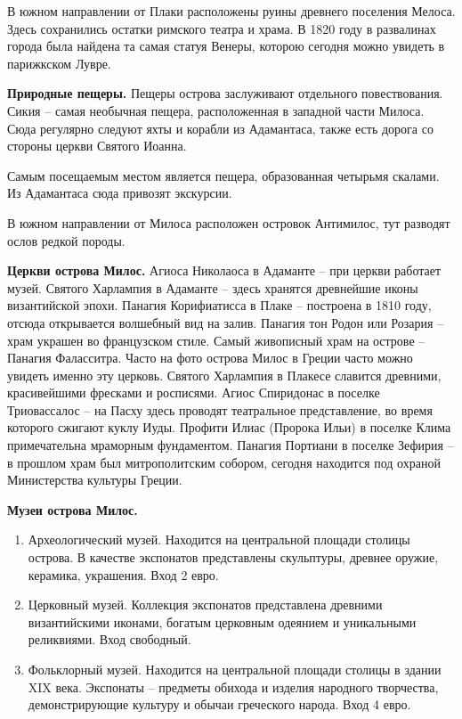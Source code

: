 В южном направлении от Плаки расположены руины древнего поселения Мелоса. Здесь сохранились остатки римского театра и храма. В 1820 году в развалинах города была найдена та самая статуя Венеры, которою сегодня можно увидеть в парижкском Лувре.

\textbf{Природные пещеры.}
Пещеры острова заслуживают отдельного повествования. Сикия – самая необычная пещера, расположенная в западной части Милоса. Сюда регулярно следуют яхты и корабли из Адамантаса, также есть дорога со стороны церкви Святого Иоанна.

Самым посещаемым местом является пещера, образованная четырьмя скалами. Из Адамантаса сюда привозят экскурсии.

В южном направлении от Милоса расположен островок Антимилос, тут разводят ослов редкой породы.

\textbf{Церкви острова Милос.}
Агиоса Николаоса в Адаманте – при церкви работает музей. Святого Харлампия в Адаманте – здесь хранятся древнейшие иконы византийской эпохи. Панагия Корифиатисса в Плаке – построена в 1810 году, отсюда открывается волшебный вид на залив. Панагия тон Родон или Розария – храм украшен во французском стиле. Самый живописный храм на острове – Панагия Фаласситра. Часто на фото острова Милос в Греции часто можно увидеть именно эту церковь. Святого Харлампия в Плакесе славится древними, красивейшими фресками и росписями. Агиос Спиридонас в поселке Триовассалос – на Пасху здесь проводят театральное представление, во время которого сжигают куклу Иуды.
Профити Илиас (Пророка Ильи) в поселке Клима примечательна мраморным фундаментом.
Панагия Портиани в поселке Зефирия – в прошлом храм был митрополитским собором, сегодня находится под охраной Министерства культуры Греции.

\textbf{Музеи острова Милос.}
\begin{enumerate}
    \item Археологический музей. Находится на центральной площади столицы острова. В качестве экспонатов представлены скульптуры, древнее оружие, керамика, украшения. Вход 2 евро.
    \item Церковный музей. Коллекция экспонатов представлена древними византийскими иконами, богатым церковным одеянием и уникальными реликвиями. Вход свободный.
    \item Фольклорный музей. Находится на центральной площади столицы в здании XIX века. Экспонаты – предметы обихода и изделия народного творчества, демонстрирующие культуру и обычаи греческого народа. Вход 4 евро.
\end{enumerate}

